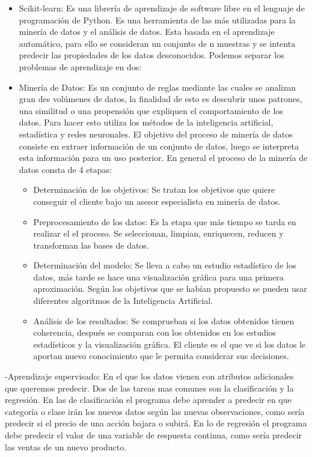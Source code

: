 
\begin{itemize}
\item Scikit-learn: Es una librería de aprendizaje de software libre en el lenguaje de programación de Python. Es una herramienta de las más utilizadas para la minería de datos y el análisis de datos. 
Esta basada en el aprendizaje automático, para ello se consideran un conjunto de n muestras y se intenta predecir las propiedades de los datos desconocidos. Podemos separar los problemas de aprendizaje en dos:

\item Minería de Datos: Es un conjunto de reglas mediante las cuales se analizan gran des volúmenes de datos, la finalidad de esto es descubrir unos patrones, una similitud o una propensión que expliquen el comportamiento de los datos.
Para hacer esto utiliza los métodos de la inteligencia artificial, estadística y redes neuronales.
El objetivo del proceso de minería de datos consiste en extraer información de un conjunto de datos, luego se interpreta esta información para un uso posterior.
En general el proceso de la minería de datos consta de 4 etapas:
	\begin{itemize}
		\item Determinación de los objetivos: Se tratan los objetivos que quiere conseguir el cliente bajo un asesor especialista en minería de datos.
		\item Preprocesamiento de los datos: Es la etapa que más tiempo se tarda en realizar el el proceso. Se seleccionan, limpian, enriquecen, reducen y transforman las bases de datos. 
		\item Determinación del modelo: Se lleva a cabo un estudio estadístico de los datos, más tarde se hace una visualización gráfica para una primera aproximación. Según los objetivos que se habían propuesto se pueden usar diferentes algoritmos de la Inteligencia Artificial.
		\item Análisis de los resultados: Se comprueban si los datos obtenidos tienen coherencia, después se comparan con los obtenidos en los estudios estadísticos y la visualización gráfica. El cliente es el que ve si los datos le aportan nuevo conocimiento que le permita considerar sus decisiones.
	\end{itemize}

\end{itemize}

-Aprendizaje supervisado: En el que los datos vienen con atributos adicionales que queremos predecir. Dos de las tareas mas comunes son la clasificación y la regresión. En las de clasificación el programa debe aprender a predecir en que categoría o clase irán los nuevos datos según las nuevas observaciones, como sería predecir si el precio de una acción bajara o subirá. En lo de regresión el programa debe predecir el valor de una variable de respuesta continua, como sería predecir las ventas de un nuevo producto. 

